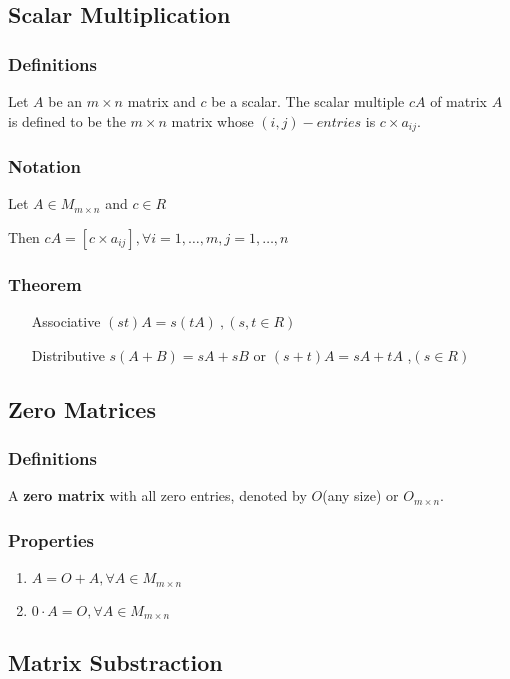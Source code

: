 \documentclass[12pt]{article}
\begin{document}
\subsection{Scalar Multiplication}
\subsubsection{Definitions}
Let $A$ be an $m \times n$ matrix and $c$ be a scalar. The scalar multiple $cA$ of matrix $A$ is defined to be the $m \times n$ matrix whose $(i,j)-entries$ is $c \times a_{ij}$.
\subsubsection{Notation}
Let $A \in M_{m \times n}$ and $c \in R$

Then $cA=[c \times a_{ij}], \forall i=1, \ldots ,m, j=1, \ldots ,n$
\subsubsection{Theorem}
\begin{enumerate}
\item[Associative] $(st)A=s(tA)\ ,(s,t \in R)$
\item[Distributive] $s(A+B)=sA+sB$ or $(s+t)A=sA+tA$ ,$(s \in R)$
\end{enumerate}

\subsection{Zero Matrices}
\subsubsection{Definitions}
A \textbf{zero matrix} with all zero entries, denoted by $O$(any size) or $O_{m \times n}$.
\subsubsection{Properties}
\begin{enumerate}
\item $A = O + A, \forall A \in M_{m \times n}$
\item $0 \cdot A = O, \forall A \in M_{m \times n}$
\end{enumerate}

\subsection{Matrix Substraction}
\end{document}
